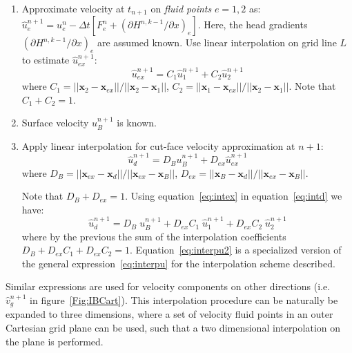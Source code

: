 \documentclass[12pt]{article}
\begin{document}
%
\begin{enumerate}

  \item Approximate velocity at $t_{n+1}$ on \textit{fluid points} $e=1,2$ as: $\hat{u}_e^{n+1}= u_e^{n} -
  \Delta t \left[ F_e^n + (\partial H^{n,k-1} / \partial x)_e \right]$. Here, the head gradients $(\partial H^{n,k-1} / \partial x)_e$ are assumed known.
  Use linear interpolation on grid line $L$ to estimate $\hat{u}_{ex}^{n+1}$:
  \begin{equation}
     \hat{u}_{ex}^{n+1} = C_1 \hat{u}_1^{n+1} + C_2 \hat{u}_2^{n+1} \label{eq:intex}
  \end{equation}
  where $C_1=||\mathbf{x}_2-\mathbf{x}_{ex}||/||\mathbf{x}_2-\mathbf{x}_{1}||$, $C_2=||\mathbf{x}_1-\mathbf{x}_{ex}||/||\mathbf{x}_2-\mathbf{x}_{1}||$. Note that $C_1+C_2=1$.

  \item Surface velocity $u_B^{n+1}$ is known.

  \item Apply linear interpolation for cut-face velocity approximation at $n+1$:
  \begin{equation}
     \hat{u}_d^{n+1}=D_B u_B^{n+1} + D_{ex} \hat{u}_{ex}^{n+1} \label{eq:intd}
  \end{equation}
   where $D_B=||\mathbf{x}_{ex}-\mathbf{x}_{d}||/||\mathbf{x}_{ex}-\mathbf{x}_{B}||$, $D_{ex}=||\mathbf{x}_{B}-\mathbf{x}_{d}||/||\mathbf{x}_{ex}-\mathbf{x}_{B}||$.

  Note that $D_B+D_{ex}=1$.  Using equation~\eqref{eq:intex} in equation~\eqref{eq:intd} we have:
  \begin{equation}
      \hat{u}_d^{n+1}=D_B \; u_B^{n+1} + D_{ex} C_1 \; \hat{u}_1^{n+1} + D_{ex} C_2 \; \hat{u}_2^{n+1}  \label{eq:interpu2}
  \end{equation}
  where by the previous the sum of the interpolation coefficients $D_{B} + D_{ex} C_1 + D_{ex} C_2 = 1$. Equation~\eqref{eq:interpu2} is a specialized version of the general expression~\eqref{eq:interpu} for the interpolation scheme described.

\end{enumerate}
%
Similar expressions are used for velocity components on other directions (i.e. $\hat{v}_g^{n+1}$ in figure~\ref{Fig:IBCart}). This interpolation procedure can be naturally be expanded to three dimensions, where a set of velocity fluid points in an outer Cartesian grid plane can be used, such that a two dimensional interpolation on the plane is performed.
\end{document}
